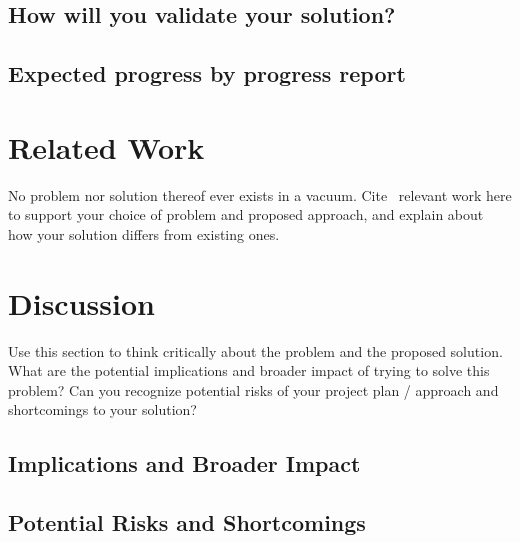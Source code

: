 \documentclass[10pt,conference,compsocconf]{IEEEtran}
\begin{document}
\subsection{How will you validate your solution?}

\subsection{Expected progress by progress report}



\section{Related Work}
No problem nor solution thereof ever exists in a vacuum.
Cite~\cite{example} relevant work here to support your choice of problem and proposed approach, and explain about how your solution differs from existing ones.


\section{Discussion}
Use this section to think critically about the problem and the proposed solution.
What are the potential implications and broader impact of trying to solve this problem?
Can you recognize potential risks of your project plan / approach and shortcomings to your solution?

\subsection{Implications and Broader Impact}

\subsection{Potential Risks and Shortcomings}




\end{document}
